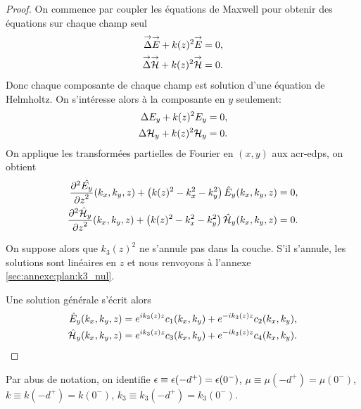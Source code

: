     \begin{proof}
      On commence par coupler les équations de Maxwell pour obtenir des équations sur chaque champ seul
      \begin{align*}
          \vlapl{\vE} + k(z)^2 \vE & = 0,
          \\
          \vlapl{\vH} + k(z)^2 \vH & = 0.
      \end{align*}
      Donc chaque composante de chaque champ est solution d'une équation de Helmholtz. On s’intéresse alors à la composante en \(y\) seulement:
      \begin{align*}
          \lapl{E_y} + k(z)^2 E_y & = 0,
          \\
          \lapl{\cH_y} + k(z)^2 \cH_y & = 0.
      \end{align*}
      On applique les transformées partielles de Fourier en \((x,y)\) aux \glspl{acr-edp}, on obtient
      \begin{align*}
          \ddr[2]{z}{\hat{E_y}}(k_x,k_y,z) + \left( k(z)^2 - k_x^2 - k_y^2\right) \hat{E}_y(k_x,k_y,z) & = 0,
          \\
          \ddr[2]{z}{\hat{\cH}_y}(k_x,k_y,z) + \left( k(z)^2 - k_x^2 - k_y^2\right) \hat{\cH}_y(k_x,k_y,z) & = 0.
      \end{align*}

      On suppose alors que \(k_3(z)^2\) ne s'annule pas dans la couche. S'il s'annule, les solutions sont linéaires en \(z\) et nous renvoyons à l'annexe \ref{sec:annexe:plan:k3_nul}.

      Une solution générale s'écrit alors
      \begin{align*}
          \hat{E}_y(k_x,k_y,z) & = e^{ik_3(z)z}c_1(k_x,k_y) + e^{-ik_3(z)z}c_2(k_x,k_y),
          \\
          \hat{\cH}_y(k_x,k_y,z) & = e^{ik_3(z)z}c_3(k_x,k_y) + e^{-ik_3(z)z}c_4(k_x,k_y).
      \end{align*}
    \end{proof}

    Par abus de notation, on identifie  \(\eps\equiv \eps(-d^+)=\eps(0^-)\), \(\mu\equiv\mu(-d^+)=\mu(0^-)\), \(k\equiv k(-d^+)=k(0^-)\), \(k_3 \equiv k_3(-d^+) = k_3(0^-)\).



